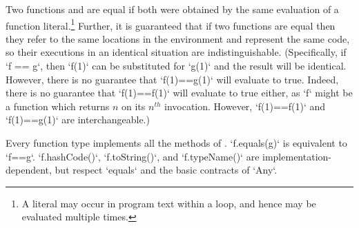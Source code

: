 \label{FunctionEquality}
  Two functions  and
 are equal if both were obtained by the same evaluation of a function
literal.\footnote{A literal may occur in program text within a loop, and hence
  may be evaluated multiple times.} Further, it is guaranteed that if two
functions are equal then they refer to the same locations in the environment
and represent the same code, so their executions in an identical situation are
indistinguishable. (Specifically, if \xcd`f == g`, then \xcd`f(1)` can be
substituted for \xcd`g(1)` and the result will be identical. However, there is
no guarantee that \xcd`f(1)==g(1)` will evaluate to true. Indeed, there is no
guarantee that \xcd`f(1)==f(1)` will evaluate to true either, as \xcd`f` might
be a function which returns {$n$} on its {$n^{th}$} invocation. However,
\xcd`f(1)==f(1)` and \xcd`f(1)==g(1)` are interchangeable.)


Every function type implements all the methods of .
\xcd`f.equals(g)` is equivalent to \xcd`f==g`.  \xcd`f.hashCode()`, 
\xcd`f.toString()`, and \xcd`f.typeName()` are implementation-dependent, but
respect \xcd`equals` and the basic contracts of \xcd`Any`. 

